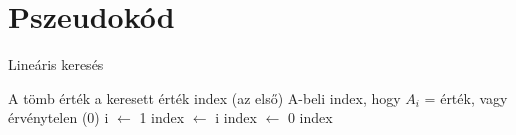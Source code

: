 \documentclass[twocolumn]{report}
\theoremstyle{definition}
\begin{document}
\chapter{Pszeudokód}

\hulipsum[1]
\begin{algorithm}
\caption{Lineáris keresés}
\begin{algorithmic}[3]
\Require A tömb érték a keresett érték
\Ensure index (az első) A-beli index, hogy $A_i$ = érték, vagy érvénytelen (0)
\State i $\gets$ 1
\State {}
\EndWhile
{}
\State index $\gets$ i
\Else
\State index $\gets$ 0
\EndIf
\State \Return index
\EndProcedure
\end{algorithmic}
\end{algorithm}
\hulipsum
\end{document}
